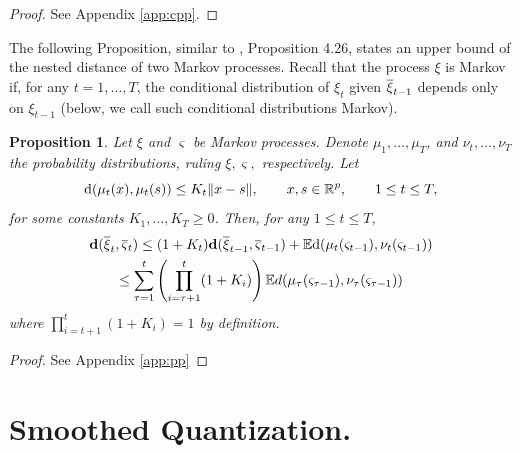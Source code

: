 \documentclass{article}              %
\newtheorem{proposition}{Proposition}
\begin{document}
\begin{proof} See Appendix \ref{app:cpp}.
\end{proof}


\noindent The following Proposition, similar to \cite{pflug2014multistage},
Proposition 4.26, states an upper bound of the nested distance of
two Markov processes. Recall that the process $\xi$ is Markov if, for any $t=1,\dots,T$, the conditional distribution of $\xi_t$ given $\overline{\xi}_{t-1}$ depends only on $\xi_{t-1}$ (below, we call such conditional distributions Markov). 
\begin{proposition}
\label{prop:pp} Let $\xi$ and $\varsigma$ be Markov processes. Denote $\mu_{1},\dots,\mu_{T}$,
and $\nu_{t},\dots,\nu_{T}$ the probability distributions, ruling $\xi,\varsigma,$
respectively.
Let
\begin{equation}
\mathrm{d}(\mu_{t}(x),\mu_{t}(s))\leq K_{t}\|x-s\|,\qquad x,s\in\mathbb{R}^{p},\qquad1\leq t\leq T,\label{eq:ktl}
\end{equation}
for some constants $K_{1},\dots,K_{T}\geq 0$. Then, for any $1\leq t\leq T$,
\begin{multline}
\mathbf{d}(\overline{\xi}_{t},\overline{\varsigma}_{t})\leq(1+K_{t})\mathbf{d}(\overline{\xi}_{t-1},\overline{\varsigma}_{t-1})+\mathbb{E}\mathrm{d}(\mu_{t}(\varsigma_{t-1}),\nu_{t}(\varsigma_{t-1}))\\
\leq\sum_{\tau=1}^{t}\left(\prod_{i=\tau+1}^{t}(1+K_{i})\right)\mathbb{E} d(\mu_{\tau}(\varsigma_{\text{\ensuremath{\tau}}-1}),\nu_{\tau}(\varsigma_{\tau-1}))\label{eq:df}
\end{multline}
where $\prod_{i=t+1}^{t}(1+K_{i}) = 1$ by definition.
\end{proposition}

\begin{proof} See Appendix \ref{app:pp}
\end{proof}

\section{\label{sec:sq}Smoothed Quantization.}
\end{document}
